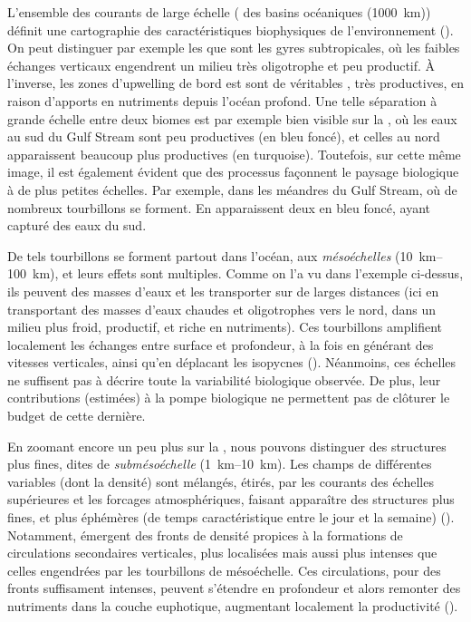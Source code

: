 L'ensemble des courants de large échelle ( des basins océaniques \OM(\qty{1000}{\km})) définit une cartographie des caractéristiques biophysiques de l'environnement (\cite{omand_2013,omand_2015a}).
On peut distinguer par exemple les  que sont les gyres subtropicales, où les faibles échanges verticaux engendrent un milieu très oligotrophe et peu productif.
À l'inverse, les zones d'upwelling de bord est sont de véritables , très productives, en raison d'apports en nutriments depuis l'océan profond.
Une telle séparation à grande échelle entre deux biomes est par exemple bien visible sur la , où les eaux au sud du Gulf Stream sont peu productives (en bleu foncé), et celles au nord apparaissent beaucoup plus productives (en turquoise).
Toutefois, sur cette même image, il est également évident que des processus façonnent le paysage biologique à de plus petites échelles.
Par exemple, dans les méandres du Gulf Stream, où de nombreux tourbillons se forment.
En apparaissent deux en bleu foncé, ayant capturé des eaux du sud.

De tels tourbillons se forment partout dans l'océan, aux \emph{mésoéchelles} \OM(\qtyrange{10}{100}{\km}), et leurs effets sont multiples.
Comme on l'a vu dans l'exemple ci-dessus, ils peuvent  des masses d'eaux et les transporter sur de larges distances (ici en transportant des masses d'eaux chaudes et oligotrophes vers le nord,  dans un milieu plus froid, productif, et riche en nutriments).
Ces tourbillons amplifient localement les échanges entre surface et profondeur, à la fois en générant des vitesses verticales, ainsi qu'en déplacant les isopycnes (\cite{mcgillicuddy_1998}).
Néanmoins, ces échelles ne suffisent pas à décrire toute la variabilité biologique observée. De plus, leur contributions (estimées) à la pompe biologique ne permettent pas de clôturer le budget de cette dernière.

En zoomant encore un peu plus sur la , nous pouvons distinguer des structures plus fines, dites de \emph{submésoéchelle} \OM(\qtyrange{1}{10}{\km}).
Les champs de différentes variables (dont la densité) sont mélangés, étirés, par les courants des échelles supérieures et les forcages atmosphériques, faisant apparaître des structures plus fines, et plus éphémères (de temps caractéristique entre le jour et la semaine) (\cite{thomas_2008,mcwilliams_2016}).
Notamment, émergent des fronts de densité propices à la formations de circulations secondaires verticales, plus localisées mais aussi plus intenses que celles engendrées par les tourbillons de mésoéchelle.
Ces circulations, pour des fronts suffisament intenses, peuvent s'étendre en profondeur et alors  remonter des nutriments dans la couche euphotique, augmentant localement la productivité (\cite{mahadevan_2016,levy_2018}).

